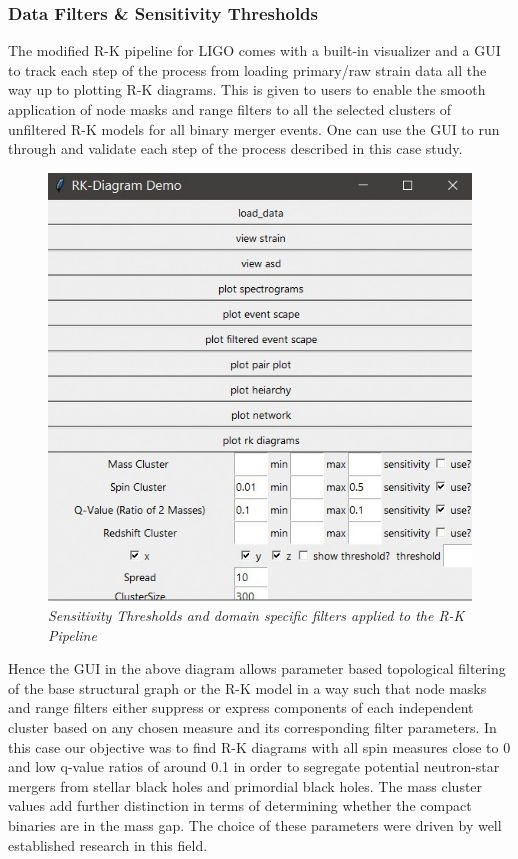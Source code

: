 \subsubsection{Data Filters \& Sensitivity Thresholds}

The modified R-K pipeline for LIGO comes with a built-in visualizer and a GUI to track each step of the process from loading primary/raw strain data all the way up to plotting R-K diagrams. This is given to users to enable the smooth application of node masks and range filters to all the selected clusters of unfiltered R-K models for all binary merger events. One can use the GUI to run through and validate each step of the process described in this case study. 

    \begin{figure}[H]
        \centering
        \includegraphics[width=1.0\linewidth]{images/71_00_Sensitivity Thresholds.jpg}
        \caption{\textit{Sensitivity Thresholds and domain specific filters applied to the R-K Pipeline }}
        \label{fig:LIGO13_PlaceHolder_fig}
    \end{figure}

Hence the GUI in the above diagram allows parameter based topological filtering of the base structural graph or the R-K model in a way such that node masks and range filters either suppress or express components of each independent cluster based on any chosen measure and its corresponding filter parameters. In this case our objective was to find R-K diagrams with all spin measures close to 0 and low q-value ratios of around 0.1 in order to segregate potential neutron-star mergers from stellar black holes and primordial black holes. The mass cluster values add further distinction in terms of determining whether the compact binaries are in the mass gap. The choice of these parameters were driven by well established research in this field. \cite{00.7_LIGOBayesianAnalysis} \cite{00.6_LIGOAnalysisPipeline} \cite{24.5_GWParameterEsitmation} \cite{24.7_qvalueestimation} \cite{24.8_PBHdetectionparameters} \cite{24.9_EffectiveSpin}


